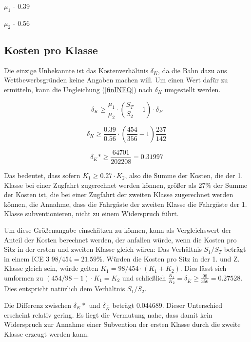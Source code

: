 \documentclass[a4paper,12pt]{article}
\begin{document}
 $\mu_1$ - 0.39
 
 $\mu_2$ - 0.56
 
\subsection{Kosten pro Klasse} 
 Die einzige Unbekannte ist das Kostenverhältnis $\delta_K$, da die Bahn dazu aus Wettbewerbsgründen keine Angaben machen will. Um einen Wert dafür zu ermitteln, kann die Ungleichung (\ref{finINEQ}) nach $\delta_K$ umgestellt werden.
 
 
 \begin{equation}
\delta_K \geq  \frac{\mu_1}{\mu_2} \cdot  \left( \frac{S_T}{S_2 } - 1 \right) \cdot \delta_P
\label{solv1}
 \end{equation}
  
 
\begin{equation}
\delta_K \geq \frac{0.39}{0.56} \cdot \left( \frac{454} {356}  - 1 \right)  \frac{237}{142} 
\label{solvnum}
\end{equation}

\begin{equation}
\delta_K* \geq \frac{64701}{202208} = 0.31997
\label{solution}
\end{equation}

Das bedeutet, dass sofern $K_1 \geq 0.27 \cdot K_2$, also die Summe der Kosten, die der 1. Klasse bei einer Zugfahrt zugerechnet werden können, größer als 27\% der Summe der Kosten ist, die bei einer Zugfahrt der zweiten Klasse zugerechnet werden können, die Annahme, dass die Fahrgäste der zweiten Klasse die Fahrgäste der 1. Klasse subventionieren, nicht zu einem Widerspruch führt.

Um diese Größenangabe einschätzen zu können, kann als Vergleichswert der Anteil der Kosten berechnet werden, der anfallen würde, wenn die Kosten pro Sitz in der ersten und zweiten Klasse gleich wären: 
Das Verhältnis $S_1/S_T$ beträgt in einem ICE 3 $98/454 = 21.59\%$. Würden die Kosten pro Sitz in der 1. und Z. Klasse gleich sein, würde gelten $K_1 = 98/454 \cdot (K_1 + K_2)$. Dies lässt sich umformen zu $(454/98 - 1)\cdot K_1 = K_2$ und schließlich $\frac{K_1}{K_2} = \delta_{\bar K} \geq \frac{98}{356} = 0.27528$. Dies entspricht natürlich dem Verhältnis $S_1/S_2$. 

Die Differenz zwischen $\delta_K*$ und $\delta_{\bar K}$ beträgt 0.044689. Dieser Unterschied erscheint relativ gering. Es liegt die Vermutung nahe, dass damit kein Widerspruch zur Annahme einer Subvention der ersten Klasse durch die zweite Klasse erzeugt werden kann.
\end{document}
